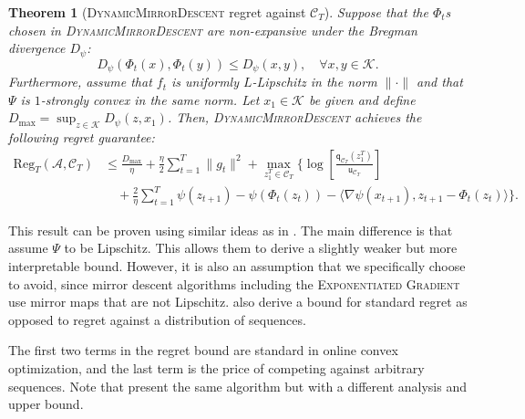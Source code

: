 \documentclass{article}
\newcommand{\sC}{\mathscr C}
\newcommand{\sfq}{{\mathsf q}}
\newcommand{\sfu}{{\mathsf u}}
\newcommand{\cA}{\mathcal A}
\newcommand{\cC}{\mathcal C}
\newcommand{\cK}{\mathcal K}
\newcommand{\Reg}{\mathrm{Reg}}
\newtheorem{theorem}{Theorem}
\begin{document}
\begin{theorem}[\textsc{DynamicMirrorDescent} regret against $\cC_T$]
  \label{th:ocobound}
  Suppose that the $\Phi_t$s chosen in \textsc{DynamicMirrorDescent} are non-expansive 
  under the Bregman divergence $D_\psi$:
$$D_\psi(\Phi_t(x), \Phi_t(y)) \leq D_\psi(x,y), \quad \forall x,y\in \cK.$$
Furthermore, assume that $f_t$ is uniformly $L$-Lipschitz in the norm $\|\cdot\|$ and that $\Psi$ is $1$-strongly convex
  in the same norm. Let $x_1 \in \cK$ be given and define 
  $D_{\max} = \sup_{z\in \cK} D_\psi(z, x_1)$. 
  Then, \textsc{DynamicMirrorDescent} 
  achieves the following regret guarantee:
\begin{align*}
  \Reg_T(\cA, \sC_T)
  &\leq\frac{D_{\max}}{\eta} + \frac{\eta}{2} \sum_{t = 1}^T \|g_t\|^2 +  \max_{z_1^T \in \cC_T} \Big\{\log\left[\frac{\sfq_{\cC_T}(z_1^T)}{\sfu_{\cC_T}}\right]\\
  &\quad + \frac{2}{\eta} \sum_{t = 1}^T \psi(z_{t+1}) - \psi(\Phi_t(z_t)) - \langle \nabla \psi(x_{t+1}), z_{t+1} - \Phi_t(z_t) \rangle \Big\}.
\end{align*}
\end{theorem}
This result can be proven using similar ideas as in \citep{HallWillett2013}. 
The main difference is that
\citet{HallWillett2013} assume $\Psi$ to be Lipschitz. This allows
them to derive a slightly weaker but more interpretable
bound. However, it is also an assumption that we specifically choose
to avoid, since mirror descent algorithms including the
\textsc{Exponentiated Gradient} use mirror maps that are not
Lipschitz. \citet{HallWillett2013} also derive a bound for standard
regret as opposed to regret against a distribution of sequences.

The first two terms in the regret bound are standard in online convex 
optimization, and the last term
is the price of competing against arbitrary sequences.
Note that \citet{GyorgySzepesvari2016} present the same algorithm
but with a different analysis and upper bound.
\end{document}
